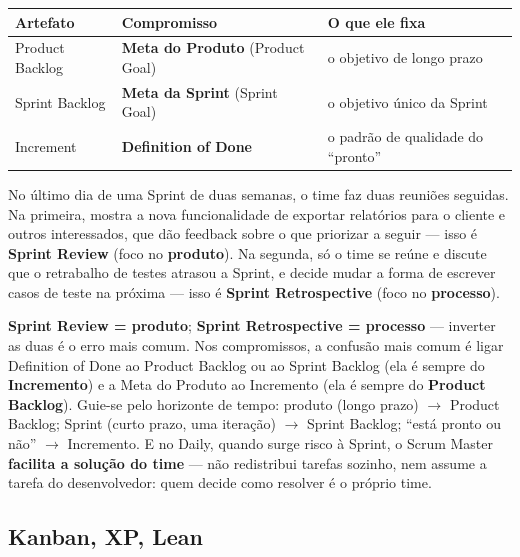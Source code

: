 \begin{conceito}
\begin{center}
\begin{tabular}{@{}p{4.2cm}p{4.4cm}p{4cm}@{}}
\toprule
\textbf{Artefato} & \textbf{Compromisso} & \textbf{O que ele fixa} \\
\midrule
Product Backlog & \textbf{Meta do Produto} (Product Goal) & o objetivo de
longo prazo \\
Sprint Backlog & \textbf{Meta da Sprint} (Sprint Goal) & o objetivo único
da Sprint \\
Increment & \textbf{Definition of Done} & o padrão de qualidade do
“pronto” \\
\bottomrule
\end{tabular}
\end{center}
\end{conceito}

\begin{exemplo}
No último dia de uma Sprint de duas semanas, o time faz duas reuniões
seguidas. Na primeira, mostra a nova funcionalidade de exportar relatórios
para o cliente e outros interessados, que dão feedback sobre o que
priorizar a seguir --- isso é \textbf{Sprint Review} (foco no
\textbf{produto}). Na segunda, só o time se reúne e discute que o
retrabalho de testes atrasou a Sprint, e decide mudar a forma de escrever
casos de teste na próxima --- isso é \textbf{Sprint Retrospective} (foco no
\textbf{processo}).
\end{exemplo}

\begin{cuidado}
\textbf{Sprint Review = produto}; \textbf{Sprint Retrospective = processo}
--- inverter as duas é o erro mais comum. Nos compromissos, a confusão
mais comum é ligar Definition of Done ao Product Backlog ou ao Sprint
Backlog (ela é sempre do \textbf{Incremento}) e a Meta do Produto ao
Incremento (ela é sempre do \textbf{Product Backlog}). Guie-se pelo
horizonte de tempo: produto (longo prazo) $\to$ Product Backlog; Sprint
(curto prazo, uma iteração) $\to$ Sprint Backlog; “está pronto ou não”
$\to$ Incremento. E no Daily, quando surge risco à Sprint, o Scrum Master
\textbf{facilita a solução do time} --- não redistribui tarefas sozinho,
nem assume a tarefa do desenvolvedor: quem decide como resolver é o
próprio time.
\end{cuidado}

\subsection{Kanban, XP, Lean}

